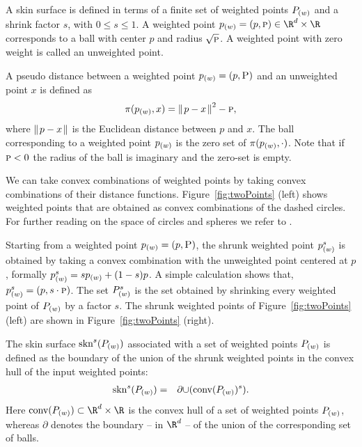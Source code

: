 A skin surface is defined in terms of a finite set of weighted points
${P}_{(w)}$ and a shrink factor $s$, with $0\leq s\leq 1$. A
weighted point $\ssWpoint{p}=({p},\textsc{p})\in \R^d\times\R$
corresponds to a ball with center ${p}$ and radius
$\sqrt{\textsc{p}}$. A weighted point with zero weight is called an
unweighted point. 

A pseudo distance between a weighted point ${p}_{(w)} =
(p,\textsc{P})$ and an unweighted point $x$ is defined as
\[
\pi({p}_{(w)},x) = {\parallel\! p-x \!\parallel}^2 - \textsc{p},
\]
where ${\parallel\! p-x \!\parallel}$ is the Euclidean distance between $p$ and $x$.  The
ball corresponding to a weighted point ${p}_{(w)}$ is the zero set
of $\pi({p}_{(w)},\cdot)$. Note that if $\textsc{p}<0$ the radius
of the ball is imaginary and the zero-set is empty.

We can take convex combinations of weighted points by taking convex
combinations of their distance functions.
%
Figure~\ref{fig:twoPoints} (left) shows weighted points that
are obtained as convex combinations of the dashed circles. For further
reading on the space of circles and spheres we refer to
\cite{p-gcc-70}.

Starting from a weighted point ${p}_{(w)}=({p},\textsc{P})$, the
shrunk weighted point ${p}_{(w)}^s$ is obtained by taking a convex
combination with the unweighted point centered at $p$, formally
${p}_{(w)}^s = s {p}_{(w)} + (1-s) p$. A simple calculation
shows that, ${p}_{(w)}^s = ({p},s\cdot \textsc{p})$.  The set
${P}_{(w)}^s$ is the set obtained by shrinking every weighted point
of ${P}_{(w)}$ by a factor $s$. The shrunk weighted points of
Figure~\ref{fig:twoPoints} (left) are shown in
Figure~\ref{fig:twoPoints} (right).

The skin surface $\mbox{skn}^{s}({P}_{(w)})$ associated with a set
of weighted points ${P}_{(w)}$ is defined as the boundary of the
union of the shrunk weighted points in the convex hull of the input
weighted points:
\begin{eqnarray}
  \label{eq:defskin}
  \mbox{skn}^{s}({P}_{(w)}) &=& \partial{\cup(\mbox{conv} ({P}_{(w)})^s)}.
\end{eqnarray}
%
Here $\mbox{conv}(\ssWpoint{P}) \subset \R^d\times\R$ is the convex
hull of a set of weighted points ${P}_{(w)}$, whereas $\partial$
denotes the boundary -- in $\R^d$ -- of the union of the corresponding
set of balls. 

